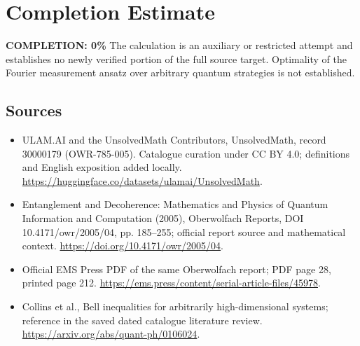 \documentclass[11pt]{article}
\begin{document}
\section{Completion Estimate}
\noindent\textbf{COMPLETION: 0\%}
The calculation is an auxiliary or restricted attempt and establishes no newly verified portion of the full source target. Optimality of the Fourier measurement ansatz over arbitrary quantum strategies is not established.

\subsection{Sources}
\begin{itemize}
\item[\hypertarget{source:30000179:1}{S1}] ULAM.AI and the UnsolvedMath Contributors, UnsolvedMath, record 30000179 (OWR-785-005). Catalogue curation under CC BY 4.0; definitions and English exposition added locally.
\url{https://huggingface.co/datasets/ulamai/UnsolvedMath}.
\item[\hypertarget{source:30000179:2}{S2}] Entanglement and Decoherence: Mathematics and Physics of Quantum Information and Computation (2005), Oberwolfach Reports, DOI 10.4171/owr/2005/04, pp. 185--255; official report source and mathematical context.
\url{https://doi.org/10.4171/owr/2005/04}.
\item[\hypertarget{source:30000179:3}{S3}] Official EMS Press PDF of the same Oberwolfach report; PDF page 28, printed page 212.
\url{https://ems.press/content/serial-article-files/45978}.
\item[\hypertarget{source:30000179:4}{S4}] Collins et al., Bell inequalities for arbitrarily high-dimensional systems; reference in the saved dated catalogue literature review.
\url{https://arxiv.org/abs/quant-ph/0106024}.
\end{itemize}
\label{end:30000179}
\end{document}
